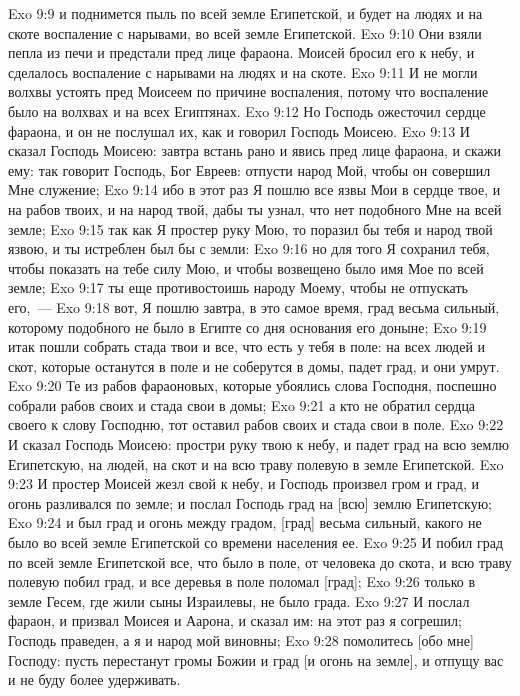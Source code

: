 \vs Exo 9:9 и поднимется пыль по всей земле Египетской, и будет на людях и на скоте воспаление с нарывами, во всей земле Египетской.
\vs Exo 9:10 Они взяли пепла из печи и предстали пред лице фараона. Моисей бросил его к небу, и сделалось воспаление с нарывами на людях и на скоте.
\vs Exo 9:11 И не могли волхвы устоять пред Моисеем по причине воспаления, потому что воспаление было на волхвах и на всех Египтянах.
\vs Exo 9:12 Но Господь ожесточил сердце фараона, и он не послушал их, как и говорил Господь Моисею.
\rsbpar\vs Exo 9:13 И сказал Господь Моисею: завтра встань рано и явись пред лице фараона, и скажи ему: так говорит Господь, Бог Евреев: отпусти народ Мой, чтобы он совершил Мне служение;
\vs Exo 9:14 ибо в этот раз Я пошлю все язвы Мои в сердце твое, и на рабов твоих, и на народ твой, дабы ты узнал, что нет подобного Мне на всей земле;
\vs Exo 9:15 так как Я простер руку Мою, то поразил бы тебя и народ твой язвою, и ты истреблен был бы с земли:
\vs Exo 9:16 но для того Я сохранил тебя, чтобы показать на тебе силу Мою, и чтобы возвещено было имя Мое по всей земле;
\vs Exo 9:17 ты еще противостоишь народу Моему, чтобы не отпускать его,~---
\vs Exo 9:18 вот, Я пошлю завтра, в это самое время, град весьма сильный, которому подобного не было в Египте со дня основания его доныне;
\vs Exo 9:19 итак пошли собрать стада твои и все, что есть у тебя в поле: на всех людей и скот, которые останутся в поле и не соберутся в домы, падет град, и они умрут.
\vs Exo 9:20 Те из рабов фараоновых, которые убоялись слова Господня, поспешно собрали рабов своих и стада свои в домы;
\vs Exo 9:21 а кто не обратил сердца своего к слову Господню, тот оставил рабов своих и стада свои в поле.
\vs Exo 9:22 И сказал Господь Моисею: простри руку твою к небу, и падет град на всю землю Египетскую, на людей, на скот и на всю траву полевую в земле Египетской.
\vs Exo 9:23 И простер Моисей жезл свой к небу, и Господь произвел гром и град, и огонь разливался по земле; и послал Господь град на [всю] землю Египетскую;
\vs Exo 9:24 и был град и огонь между градом, [град] весьма сильный, какого не было во всей земле Египетской со времени населения ее.
\vs Exo 9:25 И побил град по всей земле Египетской все, что было в поле, от человека до скота, и всю траву полевую побил град, и все деревья в поле поломал [град];
\vs Exo 9:26 только в земле Гесем, где жили сыны Израилевы, не было града.
\vs Exo 9:27 И послал фараон, и призвал Моисея и Аарона, и сказал им: на этот раз я согрешил; Господь праведен, а я и народ мой виновны;
\vs Exo 9:28 помолитесь [обо мне] Господу: пусть перестанут громы Божии и град [и огонь на земле], и отпущу вас и не буду более удерживать.
